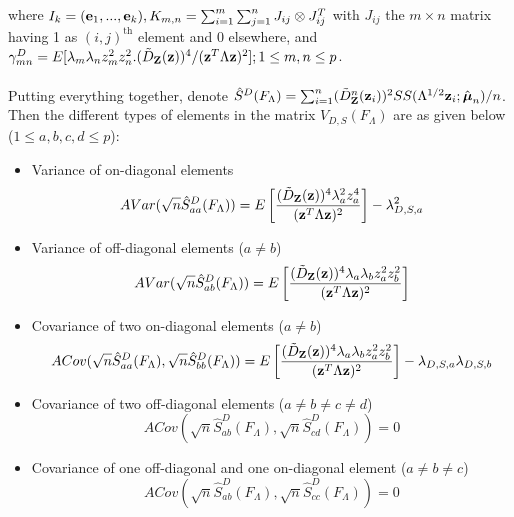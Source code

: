 \documentclass[fleqn,12pt]{article}
\begin{document}
where $I_k = ({\bf{e}}_1,...,{\bf{e}}_k), K_{m,n} = \sum_{i=1}^m \sum_{j=1}^n J_{ij} \otimes J_{ij}^T$ with $J_{ij}$ the $m \times n$ matrix having 1 as $(i,j)^\text{th}$ element and 0 elsewhere, and $\gamma^D_{mn} = E[ \lambda_m \lambda_n z_m^2 z_n ^2 . (\tilde D_{\mathbf{Z}} ({\bf{z}}))^4 / ({\bf{z}}^T \Lambda {\bf{z}})^2]; 1 \leq m,n \leq p$.

\paragraph{}Putting everything together, denote $\hat S^D(F_\Lambda) = \sum_{i=1}^n (\tilde D^n_{\mathbf{Z}} ({\bf{z}}_i))^2 SS(\Lambda^{1/2}{\bf{z}}_i; \hat {{\boldsymbol{\mu}}}_n)/n $. Then the different types of elements in the matrix $V_{D,S}(F_\Lambda)$ are as given below ($1 \leq a,b,c,d \leq p$):

\begin{itemize}
\item Variance of on-diagonal elements
$$ AVar( \sqrt n \hat S^D_{aa} (F_\Lambda)) = E \left[ \frac{(\tilde D_{\mathbf{Z}} ({\bf{z}}))^4 \lambda_a^2 z_a^4}{({\bf{z}}^T \Lambda {\bf{z}})^2} \right] - \lambda_{D,S,a}^2 $$

\item Variance of off-diagonal elements ($a \neq b$)
$$ AVar( \sqrt n \hat S^D_{ab} (F_\Lambda)) = E \left[ \frac{(\tilde D_{\mathbf{Z}} ({\bf{z}}))^4 \lambda_a \lambda_b z_a^2 z_b^2}{({\bf{z}}^T \Lambda {\bf{z}})^2} \right] $$

\item Covariance of two on-diagonal elements ($a \neq b$)
$$ ACov(\sqrt n \hat S^D_{aa} (F_\Lambda), \sqrt n \hat S^D_{bb} (F_\Lambda))
= E \left[ \frac{(\tilde D_{\mathbf{Z}} ({\bf{z}}))^4 \lambda_a \lambda_b z_a^2 z_b^2}{({\bf{z}}^T \Lambda {\bf{z}})^2} \right] - \lambda_{D,S,a} \lambda_{D,S,b} $$

\item Covariance of two off-diagonal elements ($a \neq b \neq c \neq d$)
$$ ACov(\sqrt n \hat S^D_{ab} (F_\Lambda), \sqrt n \hat S^D_{cd} (F_\Lambda)) = 0 $$

\item Covariance of one off-diagonal and one on-diagonal element ($a \neq b \neq c$)
$$ ACov(\sqrt n \hat S^D_{ab} (F_\Lambda), \sqrt n \hat S^D_{cc} (F_\Lambda)) = 0 $$
\end{itemize}
\end{document}
